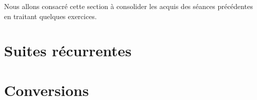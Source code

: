 Nous allons consacr\'e  cette section  \`a  consolider les acquis  des
s\'eances pr\'ec\'edentes en traitant quelques exercices.

\section{Suites r\'ecurrentes}
\label{sec:SuitesRecurrentes}


\section{Conversions}
\label{sec:Conversions}




